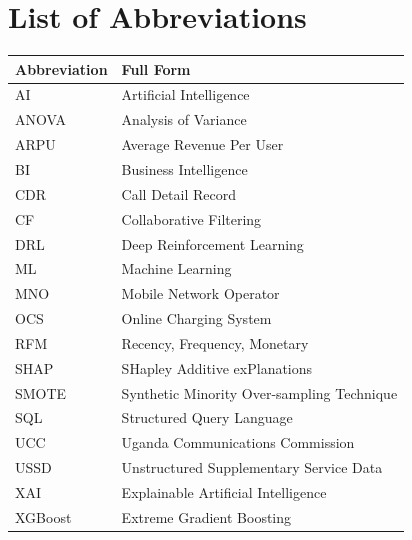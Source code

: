 \tableofcontents
\listoffigures
{}
\listoftables
{}

\newpage
\chapter*{List of Abbreviations}

\begin{tabular}{p{4cm}p{10cm}}
\toprule
\textbf{Abbreviation} & \textbf{Full Form} \\
\midrule
AI      & Artificial Intelligence \\
ANOVA   & Analysis of Variance \\
ARPU    & Average Revenue Per User \\
BI      & Business Intelligence \\
CDR     & Call Detail Record \\
CF      & Collaborative Filtering \\
DRL     & Deep Reinforcement Learning \\
ML      & Machine Learning \\
MNO     & Mobile Network Operator \\
OCS     & Online Charging System \\
RFM     & Recency, Frequency, Monetary \\
SHAP    & SHapley Additive exPlanations \\
SMOTE   & Synthetic Minority Over-sampling Technique \\
SQL     & Structured Query Language \\
UCC     & Uganda Communications Commission \\
USSD    & Unstructured Supplementary Service Data \\
XAI     & Explainable Artificial Intelligence \\
XGBoost & Extreme Gradient Boosting \\
\bottomrule
\end{tabular}